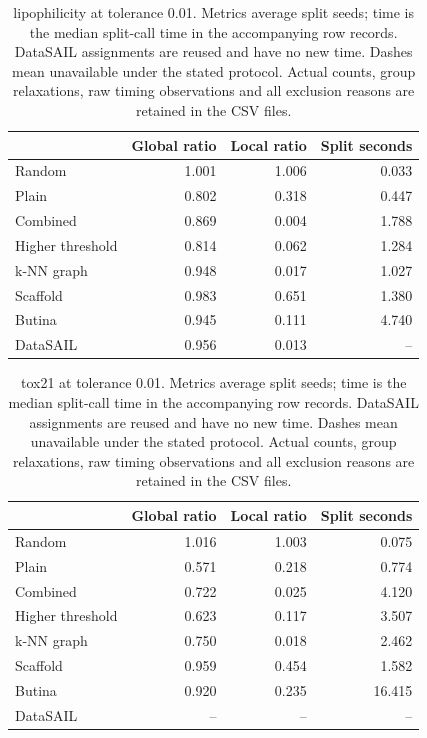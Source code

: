 \begin{table}[htbp]\centering\small
\begin{tabular}{lrrr}
\toprule
 & Global ratio & Local ratio & Split seconds \\
\midrule
Random & 1.001 & 1.006 & 0.033 \\
Plain & 0.802 & 0.318 & 0.447 \\
Combined & 0.869 & 0.004 & 1.788 \\
Higher threshold & 0.814 & 0.062 & 1.284 \\
k-NN graph & 0.948 & 0.017 & 1.027 \\
Scaffold & 0.983 & 0.651 & 1.380 \\
Butina & 0.945 & 0.111 & 4.740 \\
DataSAIL & 0.956 & 0.013 & -- \\
\bottomrule
\end{tabular}

\caption{lipophilicity at tolerance 0.01. Metrics average split seeds; time is the median split-call time in the accompanying row records. DataSAIL assignments are reused and have no new time. Dashes mean unavailable under the stated protocol. Actual counts, group relaxations, raw timing observations and all exclusion reasons are retained in the CSV files.}\end{table}
\begin{table}[htbp]\centering\small
\begin{tabular}{lrrr}
\toprule
 & Global ratio & Local ratio & Split seconds \\
\midrule
Random & 1.016 & 1.003 & 0.075 \\
Plain & 0.571 & 0.218 & 0.774 \\
Combined & 0.722 & 0.025 & 4.120 \\
Higher threshold & 0.623 & 0.117 & 3.507 \\
k-NN graph & 0.750 & 0.018 & 2.462 \\
Scaffold & 0.959 & 0.454 & 1.582 \\
Butina & 0.920 & 0.235 & 16.415 \\
DataSAIL & -- & -- & -- \\
\bottomrule
\end{tabular}

\caption{tox21 at tolerance 0.01. Metrics average split seeds; time is the median split-call time in the accompanying row records. DataSAIL assignments are reused and have no new time. Dashes mean unavailable under the stated protocol. Actual counts, group relaxations, raw timing observations and all exclusion reasons are retained in the CSV files.}\end{table}
